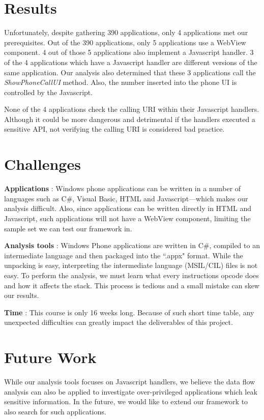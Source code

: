 \documentclass[conference]{IEEEtran}
\begin{document}
\section{Results}

Unfortunately, despite gathering 390 applications, only 4 applications met our prerequisites.
Out of the 390 applications, only 5 applications use a WebView component.
4 out of those 5 applications also implement a Javascript handler.
3 of the 4 applications which have a Javascript handler are different versions of the same application.
Our analysis also determined that these 3 applications call the \textit{ShowPhoneCallUI} method.
Also, the number inserted into the phone UI is controlled by the Javascript.

None of the 4 applications check the calling URI within their Javascript handlers.
Although it could be more dangerous and detrimental if the handlers executed a sensitive API, not verifying the calling URI is considered bad practice.

\section{Challenges}

\textbf{Applications} :  Windows phone applications can be written in a number of languages such as C\#, Visual Basic, HTML and Javascript---which makes our analysis difficult. Also, since applications can be written directly in HTML and Javascript, such applications will not have a WebView component, limiting the sample set we can test our framework in.

\textbf{Analysis tools} : Windows Phone applications are written in C\#, compiled to an intermediate language and then packaged into the ``.appx" format. While the unpacking is easy, interpreting the intermediate language (MSIL/CIL) files is not easy. To perform the analysis, we must learn what every instructions opcode does and how it affects the stack. This process is tedious and a small mistake can skew our results.

\textbf{Time} : This course is only 16 weeks long. Because of such short time table, any unexpected difficulties can greatly impact the deliverables of this project.

\section{Future Work}

While our analysis tools focuses on Javascript handlers, we believe the data flow analysis can also be applied to investigate over-privileged applications which leak sensitive information.
In the future, we would like to extend our framework to also search for such applications.
\end{document}
